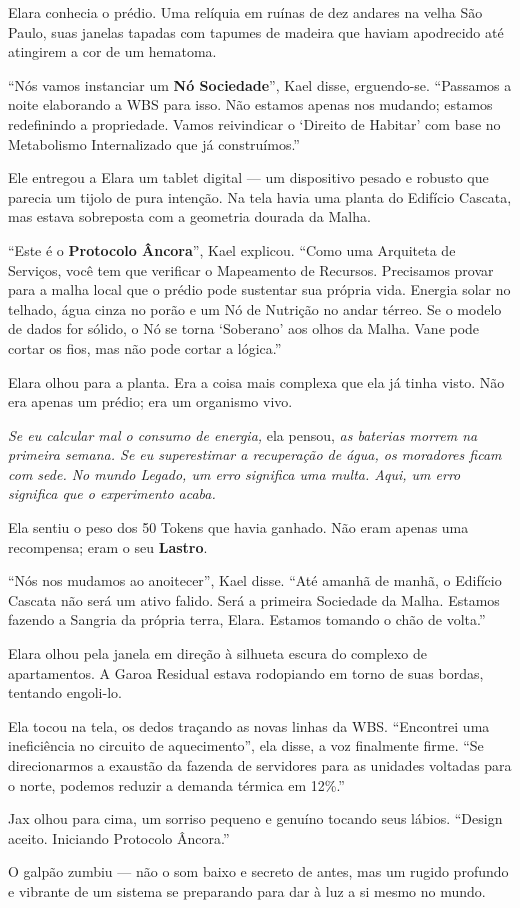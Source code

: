 Elara conhecia o prédio. Uma relíquia em ruínas de dez andares na velha São Paulo, suas janelas tapadas com tapumes de madeira que haviam apodrecido até atingirem a cor de um hematoma.

``Nós vamos instanciar um \textbf{Nó Sociedade}'', Kael disse, erguendo-se. ``Passamos a noite elaborando a WBS para isso. Não estamos apenas nos mudando; estamos redefinindo a propriedade. Vamos reivindicar o `Direito de Habitar' com base no Metabolismo Internalizado que já construímos.''

Ele entregou a Elara um tablet digital --- um dispositivo pesado e robusto que parecia um tijolo de pura intenção. Na tela havia uma planta do Edifício Cascata, mas estava sobreposta com a geometria dourada da Malha.

``Este é o \textbf{Protocolo Âncora}'', Kael explicou. ``Como uma Arquiteta de Serviços, você tem que verificar o Mapeamento de Recursos. Precisamos provar para a malha local que o prédio pode sustentar sua própria vida. Energia solar no telhado, água cinza no porão e um Nó de Nutrição no andar térreo. Se o modelo de dados for sólido, o Nó se torna `Soberano' aos olhos da Malha. Vane pode cortar os fios, mas não pode cortar a lógica.''

Elara olhou para a planta. Era a coisa mais complexa que ela já tinha visto. Não era apenas um prédio; era um organismo vivo.

\textit{Se eu calcular mal o consumo de energia,} ela pensou, \textit{as baterias morrem na primeira semana. Se eu superestimar a recuperação de água, os moradores ficam com sede. No mundo Legado, um erro significa uma multa. Aqui, um erro significa que o experimento acaba.}

Ela sentiu o peso dos 50 Tokens que havia ganhado. Não eram apenas uma recompensa; eram o seu \textbf{Lastro}.

``Nós nos mudamos ao anoitecer'', Kael disse. ``Até amanhã de manhã, o Edifício Cascata não será um ativo falido. Será a primeira Sociedade da Malha. Estamos fazendo a Sangria da própria terra, Elara. Estamos tomando o chão de volta.''

Elara olhou pela janela em direção à silhueta escura do complexo de apartamentos. A Garoa Residual estava rodopiando em torno de suas bordas, tentando engoli-lo.

Ela tocou na tela, os dedos traçando as novas linhas da WBS. ``Encontrei uma ineficiência no circuito de aquecimento'', ela disse, a voz finalmente firme. ``Se direcionarmos a exaustão da fazenda de servidores para as unidades voltadas para o norte, podemos reduzir a demanda térmica em 12\%.''

Jax olhou para cima, um sorriso pequeno e genuíno tocando seus lábios. ``Design aceito. Iniciando Protocolo Âncora.''

O galpão zumbiu --- não o som baixo e secreto de antes, mas um rugido profundo e vibrante de um sistema se preparando para dar à luz a si mesmo no mundo.
